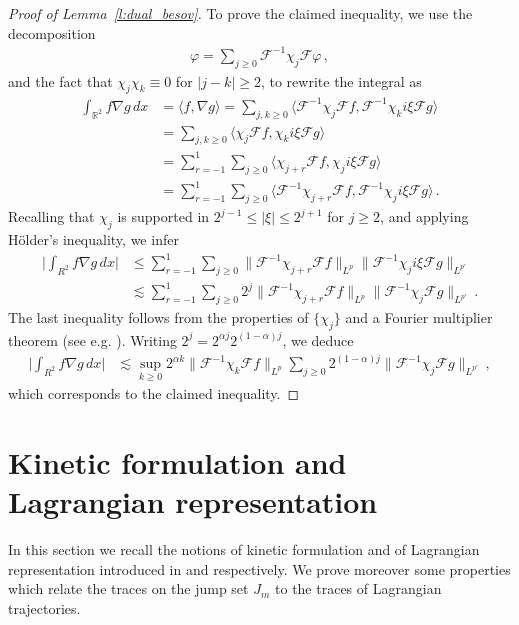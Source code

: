 \documentclass[fleqn
]{article}
\numberwithin{equation}{section}
\newcommand{\R}{{\mathbb R}}
\theoremstyle{definition}
\begin{document}
\begin{proof}[Proof of Lemma~\ref{l:dual_besov}]
To prove the claimed inequality, we use the decomposition
\begin{align*}
\varphi =\sum_{j\geq 0}\mathcal F^{-1}\chi_j\mathcal F \varphi\,,
\end{align*}
and the fact that $\chi_j\chi_k\equiv 0$ for $|j-k|\geq 2$,
to rewrite the integral as
\begin{align*}
\int_{\R^2}f\nabla g\, dx
&
=\langle f,\nabla g\rangle
=\sum_{j,k\geq 0}
\langle \mathcal F^{-1}\chi_j\mathcal F f,\mathcal F^{-1}\chi_k i\xi \mathcal F g\rangle
\\
&
=\sum_{j,k\geq 0}
\langle \chi_j\mathcal F f,\chi_k i\xi \mathcal F g\rangle
\\
&
=\sum_{r=-1}^1 \sum_{j\geq 0}
\langle \chi_{j+r}\mathcal F f,\chi_j i\xi\mathcal F g\rangle
\\
&
=\sum_{r=-1}^1 \sum_{j\geq 0}
\langle\mathcal F^{-1} \chi_{j+r}\mathcal F f,\mathcal F^{-1}\chi_j i\xi\mathcal F g\rangle\,.
\end{align*}
Recalling that $\chi_j$ is supported in $2^{j-1}\leq |\xi|\leq 2^{j+1}$ for $j\geq 2$, 
and applying Hölder's inequality, we infer
\begin{align*}
\bigg|\int_{R^2} f\nabla g\, dx\bigg|
&
\leq \sum_{r=-1}^1
\sum_{j\geq 0}
\|\mathcal F^{-1} \chi_{j+r}\mathcal F f\|_{L^p}
\|\mathcal F^{-1}\chi_j i\xi \mathcal F g\|_{L^{p'}}
\\
&
\lesssim
\sum_{r=-1}^1
\sum_{j\geq 0}
2^j\|\mathcal F^{-1} \chi_{j+r}\mathcal F f\|_{L^p}
\|\mathcal F^{-1}\chi_j  \mathcal F g\|_{L^{p'}}\,.
\end{align*}
The last inequality follows
 from the properties of $\lbrace\chi_j\rbrace$ and 
a Fourier multiplier theorem (see e.g. \cite[\S{1.5}]{triebel83}).
Writing $2^j=2^{\alpha j} 2^{(1-\alpha)j}$, we deduce
\begin{align*}
\bigg|\int_{R^2} f\nabla g\, dx\bigg|
&
\lesssim
\sup_{k\geq 0}
2^{\alpha k}\|\mathcal F^{-1} \chi_{k}\mathcal F f\|_{L^p}
\sum_{j\geq 0}
2^{(1-\alpha)j}\|\mathcal F^{-1}\chi_j  \mathcal F g\|_{L^{p'}}\,,
\end{align*}
which corresponds to the claimed inequality.
\end{proof}




\section{Kinetic formulation and Lagrangian representation}

In this section we recall the notions of kinetic formulation and of Lagrangian representation introduced in \cite{jabinperthame01,GL20} and \cite{marconi21ellipse} respectively. 
We prove moreover some properties which relate the traces on the jump set $J_m$ to the traces of Lagrangian trajectories.
\end{document}
